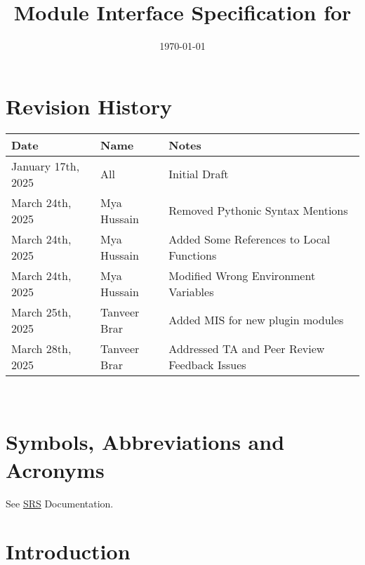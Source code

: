 \documentclass[12pt, titlepage]{article}
\begin{document}
\title{Module Interface Specification for \progname{}}

\author{\authname}

\date{\today}

\maketitle


\section{Revision History}

\begin{tabularx}{\textwidth}{p{3cm}p{2cm}X}
\toprule {\bf Date} & {\bf Name} & {\bf Notes}\\
\midrule
January 17th, 2025 & All & Initial Draft\\
March 24th, 2025 & Mya Hussain & Removed Pythonic Syntax Mentions\\
March 24th, 2025 & Mya Hussain & Added Some References to Local Functions\\
March 24th, 2025 & Mya Hussain & Modified Wrong Environment Variables\\
March 25th, 2025 & Tanveer Brar & Added MIS for new plugin modules\\
March 28th, 2025 & Tanveer Brar & Addressed TA and Peer Review Feedback Issues\\
\bottomrule
\end{tabularx}

~\newpage

\section{Symbols, Abbreviations and Acronyms}

See \href{https://github.com/ssm-lab/capstone--source-code-optimizer/blob/main/docs/SRS/SRS.pdf}{SRS} Documentation.


\newpage

\tableofcontents

\newpage


\section{Introduction}
\end{document}
